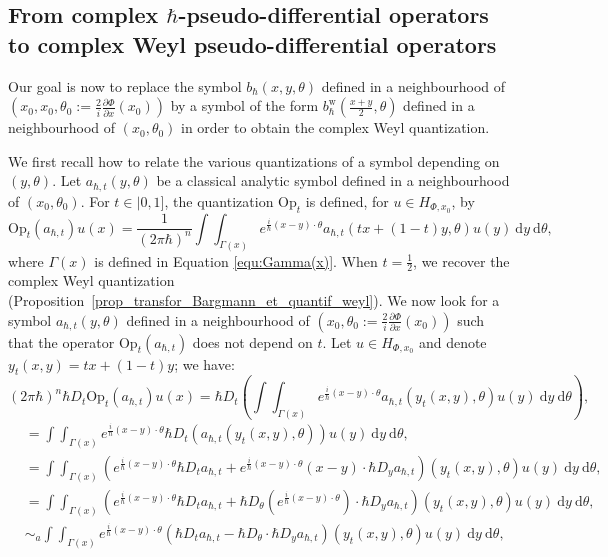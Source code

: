 \documentclass{article}
\newcommand{\Op}{\mathrm{Op}}
\newcommand{\w}{\mathrm{w}}
\newcommand{\DD}{\:\!\mathrm{d}}
\newcommand{\intint}{\int\!\!\!\!\int}
\newcommand{\h}{\hbar}
\begin{document}
\subsection{From complex \texorpdfstring{$\h$}{h}-pseudo-differential
  operators to complex Weyl pseudo-differential operators}
\label{sec:from-hbar-pseudo}

Our goal is now to replace the symbol $b_{ \hbar}(x, y, \theta)$
defined in a neighbourhood of
$\left( x_0, x_0, \theta_0 := \frac{2}{i} \frac{\partial
    \Phi}{\partial x}(x_0) \right)$
by a symbol of the form
$b^{\w}_{ \hbar} \left( \tfrac{x+y}{2}, \theta \right)$ defined in a
neighbourhood of $\left( x_0, \theta_0\right)$ in order to obtain the
complex Weyl quantization.


We first recall how to relate the various quantizations of a symbol
depending on $(y,\theta)$. Let $a_{\hbar, t}(y, \theta)$ be a
classical analytic symbol defined in a neighbourhood of
$\left(x_0, \theta_0 \right)$.  For $t\in|0,1]$, the quantization
$\Op_t$ is defined, for $u \in H_{\Phi, x_0}$, by
\[
\Op_t(a_{\hbar, t}) u(x) = \dfrac{1}{(2 \pi \hbar)^n}
\intint_{\Gamma(x)} e^{\frac{i}{\h}(x-y) \cdot \theta} a_{ \hbar,
  t}(tx+(1-t)y, \theta) u(y) \DD y \DD \theta,
\]
where $ \Gamma(x)$ is defined in Equation \eqref{equ:Gamma(x)}.  When
$t = \frac{1}{2}$, we recover the complex Weyl quantization
(Proposition~\ref{prop_transfor_Bargmann_et_quantif_weyl}).  We now
look for a symbol $a_{ \hbar, t}(y, \theta)$ defined in a
neighbourhood of
$\left(x_0, \theta_0:= \frac{2}{i} \frac{\partial \Phi}{\partial
    x}(x_0) \right)$
such that the operator $ \Op_t(a_{ \hbar, t})$ does not depend on
$t$. Let $u \in H_{ \Phi, x_0}$ and denote $y_t(x,y)=tx+(1-t)y$; we
have:
\[
(2 \pi \hbar)^n \hbar D_t \Op_t(a_{ \hbar, t}) u(x) = \hbar D_t \left(
  \intint_{\Gamma(x)} e^{\frac{i}{\h}(x-y) \cdot \theta} a_{ \hbar,
    t}(y_t(x,y), \theta) u(y) \DD y \DD \theta \right),
\]
\begin{align}
  & =  \intint_{\Gamma(x)}  e^{\frac{i}{\h}(x-y)\cdot \theta}
    \hbar D_t \left( a_{ \hbar, t}(y_t(x,y), \theta) \right) u(y) \DD y \DD \theta, \\
  & =  \intint_{\Gamma(x)} \left( e^{\frac{i}{\h}(x-y)\cdot \theta} 
    \hbar D_t a_{ \hbar, t}   + e^{\frac{i}{\h}(x-y)\cdot \theta} (x-y) 
    \cdot \hbar D_y a_{ \hbar, t}  \right) (y_t(x,y), \theta) u(y) \DD y \DD \theta, \\
  & = \intint_{\Gamma(x)} \left( e^{\frac{i}{\h}(x-y)\cdot \theta}
    \hbar D_t a_{ \hbar, t}  + \hbar D_{ \theta} 
    (e^{\frac{i}{\h}(x-y)\cdot \theta})
    \cdot
    \hbar D_y a_{ \hbar, t} \right)(y_t(x,y), \theta) u(y) \DD y \DD \theta, \\
  & \sim_a  \intint_{\Gamma(x)} e^{\frac{i}{\h}(x-y)\cdot \theta} 
    \left(  \hbar D_t a_{ \hbar, t}  - \hbar D_{ \theta}\cdot  \hbar D_y a_{ \hbar, t} \right) 
    (y_t(x,y), \theta) 
    u(y) \DD y \DD \theta,
\end{align}
\end{document}
